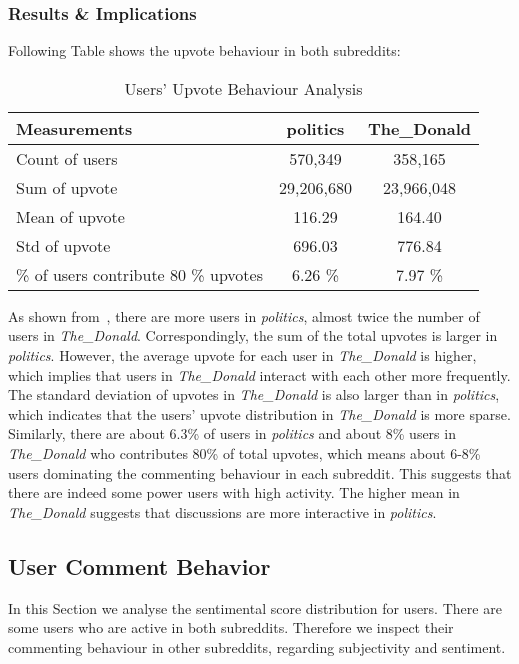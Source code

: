 \documentclass[runningheads,a4paper]{llncs}
\begin{document}
	\subsubsection{Results \& Implications}
	Following Table shows the upvote behaviour in both subreddits:
	\begin{table}
		\caption{Users' Upvote Behaviour Analysis}
		\centering
		\setlength{\tabcolsep}{5px}
		\begin{tabular}{l | c | c  }
			\hline\hline
			Measurements & politics & The\_Donald \\
			\hline
			Count of users & 570,349 & 358,165 \\
			Sum of upvote & 29,206,680 & 23,966,048  \\
			Mean of upvote & 116.29 & 164.40 \\
			Std of upvote & 696.03 & 776.84 \\
			\% of users contribute 80 \% upvotes & 6.26 \% & 7.97 \% \\
			\hline\hline
		\end{tabular}
		\label{table:upvote}
	\end{table}
	As shown from~, there are more users in \textit{politics}, almost twice the number of users in \textit{The\_Donald}. Correspondingly, the sum of the total upvotes is larger in \textit{politics}. However, the average upvote for each user in \textit{The\_Donald} is higher, which implies that users in \textit{The\_Donald} interact with each other more frequently. The standard deviation of upvotes in \textit{The\_Donald} is also larger than in \textit{politics}, which indicates that the users' upvote distribution in \textit{The\_Donald} is more sparse. Similarly, there are about 6.3\% of users in \textit{politics} and about 8\% users in \textit{The\_Donald} who contributes 80\% of total upvotes, which means about 6-8\% users dominating the commenting behaviour in each subreddit. This suggests that there are indeed some power users with high activity. The higher mean in \textit{The\_Donald} suggests that discussions are more interactive in \textit{politics}.
	\subsection{User Comment Behavior}\label{sub:UserCommentBehavior}
	In this Section we analyse the sentimental score distribution for users. There are some users who are active in both subreddits. Therefore we inspect their commenting behaviour in other subreddits, regarding subjectivity and sentiment.
\end{document}
